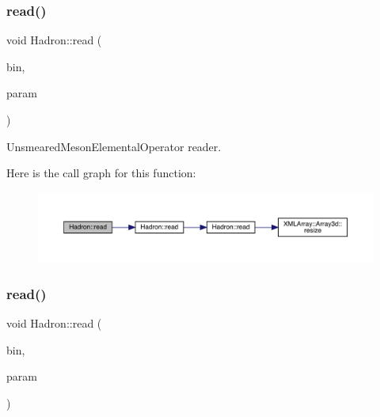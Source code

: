 \subsubsection{\texorpdfstring{read()}{read()}\hspace{0.1cm}{\footnotesize\ttfamily [73/94]}}
{\footnotesize\ttfamily void Hadron\+::read (\begin{DoxyParamCaption}\item[{\mbox{\hyperlink{classADATIO_1_1BinaryReader}{Binary\+Reader}} \&}]{bin,  }\item[{\mbox{\hyperlink{structHadron_1_1ValUnsmearedMesonElementalOperator__t}{Val\+Unsmeared\+Meson\+Elemental\+Operator\+\_\+t}} \&}]{param }\end{DoxyParamCaption})}



Unsmeared\+Meson\+Elemental\+Operator reader. 

Here is the call graph for this function\+:\nopagebreak
\begin{figure}[H]
\begin{center}
\leavevmode
\includegraphics[width=350pt]{d1/daf/namespaceHadron_a0dee7d09d7d8dd3947cd5a0c3c4c0447_cgraph}
\end{center}
\end{figure}
\mbox{\label{namespaceHadron_a26908582ef57fc950c0944a69dfcc275}} 
\subsubsection{\texorpdfstring{read()}{read()}\hspace{0.1cm}{\footnotesize\ttfamily [74/94]}}
{\footnotesize\ttfamily void Hadron\+::read (\begin{DoxyParamCaption}\item[{\mbox{\hyperlink{classADATIO_1_1BinaryReader}{Binary\+Reader}} \&}]{bin,  }\item[{\mbox{\hyperlink{structHadron_1_1ValGenPropElementalOperator__t}{Val\+Gen\+Prop\+Elemental\+Operator\+\_\+t}} \&}]{param }\end{DoxyParamCaption})}



